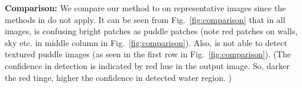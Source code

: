 \textbf{Comparison:} We compare our method to \cite{rankin2004daytime} on
representative images since the methods in \cite{rankin11} do not apply. 
It can be seen
from Fig.~\ref{fig:comparison} that in all images, \cite{rankin2004daytime} is
confusing bright patches as puddle patches (note red patches on walls, sky etc. in middle column in Fig.~\ref{fig:comparison}). Also, \cite{rankin2004daytime} is
not able to detect textured puddle images (as seen in the first row in
Fig.~\ref{fig:comparison}). (The confidence in detection is indicated by red hue in the output image. 
So, darker the red tinge, higher the confidence in detected water region. )
\begin{figure}[p]
  \centering
  

\end{figure}
